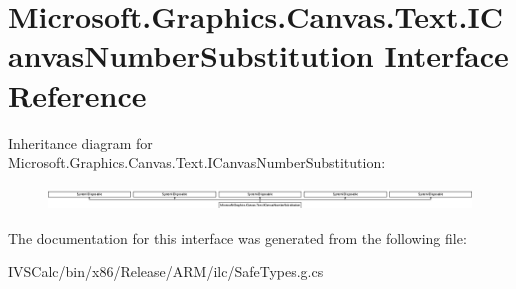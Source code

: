 \hypertarget{interface_microsoft_1_1_graphics_1_1_canvas_1_1_text_1_1_i_canvas_number_substitution}{}\section{Microsoft.\+Graphics.\+Canvas.\+Text.\+I\+Canvas\+Number\+Substitution Interface Reference}
\label{interface_microsoft_1_1_graphics_1_1_canvas_1_1_text_1_1_i_canvas_number_substitution}
Inheritance diagram for Microsoft.\+Graphics.\+Canvas.\+Text.\+I\+Canvas\+Number\+Substitution\+:\begin{figure}[H]
\begin{center}
\leavevmode
\includegraphics[height=0.622222cm]{interface_microsoft_1_1_graphics_1_1_canvas_1_1_text_1_1_i_canvas_number_substitution}
\end{center}
\end{figure}


The documentation for this interface was generated from the following file\+:\begin{DoxyCompactItemize}
\item 
I\+V\+S\+Calc/bin/x86/\+Release/\+A\+R\+M/ilc/Safe\+Types.\+g.\+cs\end{DoxyCompactItemize}
